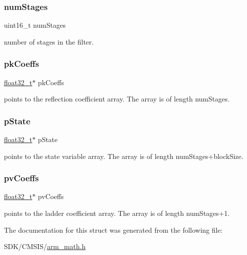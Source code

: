 \subsubsection{\texorpdfstring{num\+Stages}{numStages}}
{\footnotesize\ttfamily uint16\+\_\+t num\+Stages}

number of stages in the filter. \mbox{\label{structarm__iir__lattice__instance__f32_a994889c5c4a866c50a0ee63326378816}} 
\subsubsection{\texorpdfstring{pk\+Coeffs}{pkCoeffs}}
{\footnotesize\ttfamily \mbox{\hyperlink{arm__math_8h_a4611b605e45ab401f02cab15c5e38715}{float32\+\_\+t}}$\ast$ pk\+Coeffs}

points to the reflection coefficient array. The array is of length num\+Stages. \mbox{\label{structarm__iir__lattice__instance__f32_a335c87e6fdc4b96601d95a5de8b9c463}} 
\subsubsection{\texorpdfstring{p\+State}{pState}}
{\footnotesize\ttfamily \mbox{\hyperlink{arm__math_8h_a4611b605e45ab401f02cab15c5e38715}{float32\+\_\+t}}$\ast$ p\+State}

points to the state variable array. The array is of length num\+Stages+block\+Size. \mbox{\label{structarm__iir__lattice__instance__f32_a0f8815744fade9c580d44277ff802308}} 
\subsubsection{\texorpdfstring{pv\+Coeffs}{pvCoeffs}}
{\footnotesize\ttfamily \mbox{\hyperlink{arm__math_8h_a4611b605e45ab401f02cab15c5e38715}{float32\+\_\+t}}$\ast$ pv\+Coeffs}

points to the ladder coefficient array. The array is of length num\+Stages+1. 

The documentation for this struct was generated from the following file\+:\begin{DoxyCompactItemize}
\item 
S\+D\+K/\+C\+M\+S\+I\+S/\mbox{\hyperlink{arm__math_8h}{arm\+\_\+math.\+h}}\end{DoxyCompactItemize}
